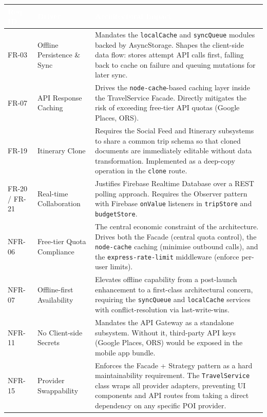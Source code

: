 \documentclass[12pt, a4paper]{article}
\newcommand{\reqid}[1]{\textsc{\small #1}}
\newcommand{\thcell}[1]{\textcolor{white}{\textbf{\small #1}}}
\begin{document}
\begin{longtable}{C{1.8cm} L{4.5cm} L{7.4cm}}
\toprule
{}
\thcell{Req ID} & \thcell{Driver} & \thcell{Architectural Impact} \\
\midrule
\endhead
\bottomrule
\endfoot

\reqid{FR-03} & Offline Persistence \& Sync &
Mandates the \texttt{localCache} and \texttt{syncQueue} modules backed by AsyncStorage. Shapes the client-side data flow: stores attempt API calls first, falling back to cache on failure and queuing mutations for later sync. \\

\reqid{FR-07} & API Response Caching &
Drives the \texttt{node-cache}-based caching layer inside the TravelService Facade. Directly mitigates the risk of exceeding free-tier API quotas (Google Places, ORS). \\

\reqid{FR-19} & Itinerary Clone &
Requires the Social Feed and Itinerary subsystems to share a common trip schema so that cloned documents are immediately editable without data transformation. Implemented as a deep-copy operation in the \texttt{clone} route. \\

\reqid{FR-20 / FR-21} & Real-time Collaboration &
Justifies Firebase Realtime Database over a REST polling approach. Requires the Observer pattern with Firebase \texttt{onValue} listeners in \texttt{tripStore} and \texttt{budgetStore}. \\

\reqid{NFR-06} & Free-tier Quota Compliance &
The central economic constraint of the architecture. Drives both the Facade (central quota control), the \texttt{node-cache} caching (minimise outbound calls), and the \texttt{express-rate-limit} middleware (enforce per-user limits). \\

\reqid{NFR-07} & Offline-first Availability &
Elevates offline capability from a post-launch enhancement to a first-class architectural concern, requiring the \texttt{syncQueue} and \texttt{localCache} services with conflict-resolution via last-write-wins. \\

\reqid{NFR-11} & No Client-side Secrets &
Mandates the API Gateway as a standalone subsystem. Without it, third-party API keys (Google Places, ORS) would be exposed in the mobile app bundle. \\

\reqid{NFR-15} & Provider Swappability &
Enforces the Facade + Strategy pattern as a hard maintainability requirement. The \texttt{TravelService} class wraps all provider adapters, preventing UI components and API routes from taking a direct dependency on any specific POI provider. \\

\end{longtable}
\end{document}

